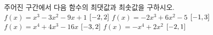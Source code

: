 주어진 구간에서 다음 함수의 최댓값과 최솟값을 구하시오.
 $f(x)=x^3-3x^2-9x+1$ \quad $[-2{,}\mkern3mu\mathopen{}2]$
 $f(x)=-2x^3+6x^2-5$ \quad $[-1{,}\mkern3mu\mathopen{}3]$
 $f(x)=x^4+4x^3-16x$ \quad $[-3{,}\mkern3mu\mathopen{}2]$
 $f(x)=-x^4+2x^2$ \quad $[-2{,}\mkern3mu\mathopen{}1]$
